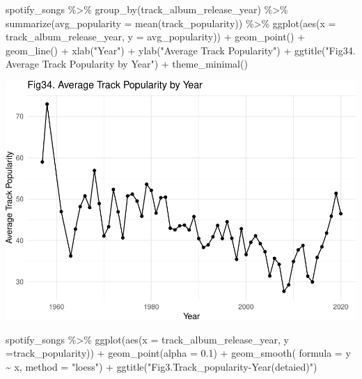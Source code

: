 \documentclass[
]{article}
\newenvironment{Shaded}{\begin{snugshade}}{\end{snugshade}}
\newcommand{\AttributeTok}[1]{\textcolor[rgb]{0.77,0.63,0.00}{#1}}
\newcommand{\FloatTok}[1]{\textcolor[rgb]{0.00,0.00,0.81}{#1}}
\newcommand{\FunctionTok}[1]{\textcolor[rgb]{0.00,0.00,0.00}{#1}}
\newcommand{\NormalTok}[1]{#1}
\newcommand{\SpecialCharTok}[1]{\textcolor[rgb]{0.00,0.00,0.00}{#1}}
\newcommand{\StringTok}[1]{\textcolor[rgb]{0.31,0.60,0.02}{#1}}
\begin{document}
\begin{Shaded}
\begin{Highlighting}[]
\NormalTok{spotify\_songs }\SpecialCharTok{\%\textgreater{}\%}
  \FunctionTok{group\_by}\NormalTok{(track\_album\_release\_year) }\SpecialCharTok{\%\textgreater{}\%}
  \FunctionTok{summarize}\NormalTok{(}\AttributeTok{avg\_popularity =} \FunctionTok{mean}\NormalTok{(track\_popularity)) }\SpecialCharTok{\%\textgreater{}\%}
  \FunctionTok{ggplot}\NormalTok{(}\FunctionTok{aes}\NormalTok{(}\AttributeTok{x =}\NormalTok{ track\_album\_release\_year, }\AttributeTok{y =}\NormalTok{ avg\_popularity)) }\SpecialCharTok{+}
  \FunctionTok{geom\_point}\NormalTok{() }\SpecialCharTok{+}
  \FunctionTok{geom\_line}\NormalTok{() }\SpecialCharTok{+}
  \FunctionTok{xlab}\NormalTok{(}\StringTok{"Year"}\NormalTok{) }\SpecialCharTok{+}
  \FunctionTok{ylab}\NormalTok{(}\StringTok{"Average Track Popularity"}\NormalTok{) }\SpecialCharTok{+}
  \FunctionTok{ggtitle}\NormalTok{(}\StringTok{"Fig34. Average Track Popularity by Year"}\NormalTok{) }\SpecialCharTok{+}
  \FunctionTok{theme\_minimal}\NormalTok{()}
\end{Highlighting}
\end{Shaded}

\includegraphics{Final-Report_files/figure-latex/unnamed-chunk-16-1.pdf}

\begin{Shaded}
\begin{Highlighting}[]
\NormalTok{spotify\_songs }\SpecialCharTok{\%\textgreater{}\%} \FunctionTok{ggplot}\NormalTok{(}\FunctionTok{aes}\NormalTok{(}\AttributeTok{x =}\NormalTok{ track\_album\_release\_year, }\AttributeTok{y =}\NormalTok{track\_popularity)) }\SpecialCharTok{+}
  \FunctionTok{geom\_point}\NormalTok{(}\AttributeTok{alpha =} \FloatTok{0.1}\NormalTok{) }\SpecialCharTok{+}
  \FunctionTok{geom\_smooth}\NormalTok{( }\AttributeTok{formula =}\NormalTok{ y }\SpecialCharTok{\textasciitilde{}}\NormalTok{ x, }\AttributeTok{method =} \StringTok{"loess"}\NormalTok{) }\SpecialCharTok{+}
  \FunctionTok{ggtitle}\NormalTok{(}\StringTok{"Fig3.Track\_popularity{-}Year(detaied)"}\NormalTok{) }
\end{Highlighting}
\end{Shaded}
\end{document}
